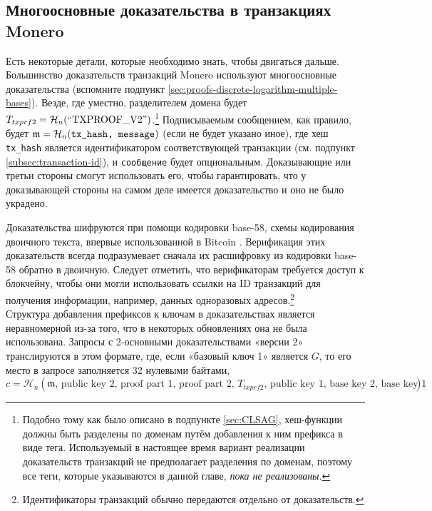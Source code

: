 \subsection{Многоосновные доказательства в транзакциях Monero}
\label{subsec:proofs-multi-base-monero}

Есть некоторые детали, которые необходимо знать, чтобы двигаться дальше. Большинство доказательств транзакций Monero используют многоосновные доказательства (вспомните под\-пункт \ref{sec:proofs-discrete-logarithm-multiple-bases}). Везде, где уместно, разделителем домена будет $T_{txprf2} = \mathcal{H}_n(``\textrm{TXPROOF\_V2}")$.\footnote{Подобно тому как было описано в подпункте \ref{sec:CLSAG}, хеш-функции должны быть разделены по доменам путём добавления к ним префикса в виде тега. Используемый в настоящее время вариант реализации доказательств транзакций не предполагает разделения по доменам, поэтому все теги, которые указываются в данной главе, {\em пока не реализованы}.} Подписываемым сообщением, как правило, будет $\mathfrak{m} = \mathcal{H}_n(\texttt{tx\_hash, \texttt{message}})$ (если не будет указано иное), где хеш {\tt tx\_hash} является идентификатором соответствующей транзакции (см. подпункт \ref{subsec:transaction-id}), и {\tt сообщение} будет опциональным. Доказывающие или третьи стороны смогут использовать его, чтобы гарантировать, что у доказывающей стороны на самом деле имеется доказательство и оно не было украдено.

Доказательства шифруются при помощи кодировки base-58, схемы кодирования двоичного текста, впервые использованной в Bitcoin \cite{base-58-encoding}. Верификация этих доказательств всегда подра\-зумевает сначала их расшифровку из кодировки base-58 обратно в двоичную. Следует отме\-тить, что верификаторам требуется доступ к блокчейну, чтобы они могли использовать ссыл\-ки на ID транзакций для получения информации, например, данных одноразовых адресов.\footnote{Идентификаторы транзакций обычно передаются отдельно от доказательств.}
\\

Структура добавления префиксов к ключам в доказательствах является неравномерной из-за того, что в некоторых обновлениях она не была использована. Запросы с 2-основными доказательствами «версии 2» транслируются в этом формате, где, если «базовый ключ 1» является $G$, то его место в запросе заполняется 32 нулевыми байтами,\vspace{.175cm}
\[c = \mathcal{H}_n(\mathfrak{m}\textrm{, public key 2, proof part 1, proof part 2, $T_{txprf2}$, public key 1, base key 2, base key 1})\]


